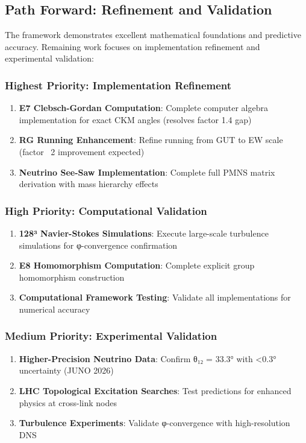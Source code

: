 \documentclass[12pt,a4paper]{article}
\begin{document}
\begin{itemize}
\begin{itemize}
\subsection{Path Forward: Refinement and Validation}

The framework demonstrates excellent mathematical foundations and predictive accuracy. Remaining work focuses on implementation refinement and experimental validation:

\subsubsection{Highest Priority: Implementation Refinement}
\begin{enumerate}
\item \textbf{E7 Clebsch-Gordan Computation}: Complete computer algebra implementation for exact CKM angles (resolves factor 1.4 gap)
\item \textbf{RG Running Enhancement}: Refine running from GUT to EW scale (factor ~2 improvement expected)
\item \textbf{Neutrino See-Saw Implementation}: Complete full PMNS matrix derivation with mass hierarchy effects
\end{enumerate}

\subsubsection{High Priority: Computational Validation}
\begin{enumerate}
\item \textbf{128³ Navier-Stokes Simulations}: Execute large-scale turbulence simulations for φ-convergence confirmation
\item \textbf{E8 Homomorphism Computation}: Complete explicit group homomorphism construction
\item \textbf{Computational Framework Testing}: Validate all implementations for numerical accuracy
\end{enumerate}

\subsubsection{Medium Priority: Experimental Validation}
\begin{enumerate}
\item \textbf{Higher-Precision Neutrino Data}: Confirm θ₁₂ = 33.3° with <0.3° uncertainty (JUNO 2026)
\item \textbf{LHC Topological Excitation Searches}: Test predictions for enhanced physics at cross-link nodes
\item \textbf{Turbulence Experiments}: Validate φ-convergence with high-resolution DNS
\end{enumerate}


\end{itemize}
\end{itemize}
\end{document}

